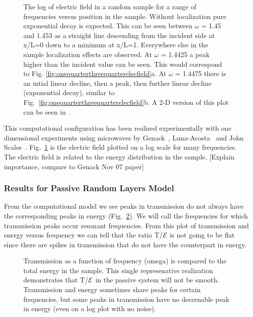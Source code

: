 \begin{figure}
\vskip -0.5cm
\centerline{}
\vskip -0.5cm
\caption[The log of electric field in a random sample for a range of frequencies versus position in the sample.]{The log of electric field in a random sample for a range of frequencies versus position in the sample. Without localization pure exponential decay is expected. This can be seen between $\omega$ =  1.45 and 1.453 as a straight line descending from the incident side at x/L=0 down to a minimum at x/L=1. Everywhere else in the sample localization effects are observed. At $\omega$ = 1.4425 a peak higher than the incident value can be seen. This would correspond to Fig. \ref{fig:onequarterthreequarterelecfield}a. At $\omega$ = 1.4475 there is an intial linear decline, then a peak, then further linear decline  (exponential decay), similar to Fig.~\ref{fig:onequarterthreequarterelecfield}b. A 2-D version of this plot can be seen in~\cite{2006_Genack_1d}.}
\label{fig:electricFieldInSample}
\end{figure}

This computational configuration has been realized experimentally with one dimensional experiments using microwaves by Genack~\cite{2006_Genack_1d}, Luna-Acosta~\cite{2008_LunaAcosta} and John Scales~\cite{2006_Scales}. Fig.~\ref{fig:electricFieldInSample} is the electric field plotted on a log scale for many frequencies. The electric field is related to the energy distribution in the sample.  [Explain importance, compare to Genack Nov 07 paper]

\subsubsection {Results for Passive Random Layers Model}

From the computational model we see peaks in transmission do not always have the corresponding peaks in energy (Fig.~\ref{fig:tenkenergytransmission}). We will call the frequencies for which transmission peaks occur resonant frequencies. From this plot of transmission and energy versus frequency we can tell that the ratio T/${\cal E}$ is not going to be flat since there are spikes in transmission that do not have the counterpart in energy.

\begin{figure}
\vskip -0.5cm
\centerline{}
\vskip -0.5cm
\caption[Transmission as a function of frequency (omega) is compared to the total energy in the sample.]{Transmission as a function of frequency (omega) is compared to the total energy in the sample. This single represenative realization demonstrates that T/${\cal E}$ in the passive system will not be smooth. Transmission and energy sometimes share peaks for certain frequencies, but some peaks in transmission have no decernable peak in energy (even on a log plot with no noise).
}
\label{fig:tenkenergytransmission}
\end{figure}

